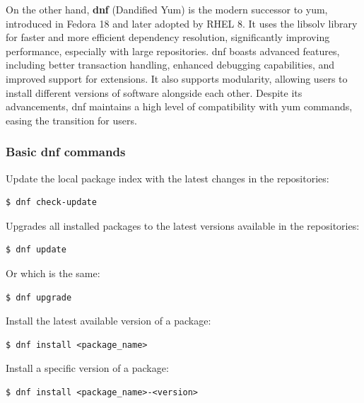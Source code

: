 \documentclass{article}
\newenvironment{codetemplate}[1][]{%
  \mybasecolorbox[#1]
  \itshape
}{%
  \endmybasecolorbox
}
\begin{document}
On the other hand, \textbf{dnf} (Dandified Yum) is the modern successor to yum, introduced in Fedora 18 and later adopted by RHEL 8. It uses the libsolv library for faster and more efficient dependency resolution, significantly improving performance, especially with large repositories. dnf boasts advanced features, including better transaction handling, enhanced debugging capabilities, and improved support for extensions. It also supports modularity, allowing users to install different versions of software alongside each other. Despite its advancements, dnf maintains a high level of compatibility with yum commands, easing the transition for users.

\subsubsection{Basic dnf commands}
Update the local package index with the latest changes in the repositories:
\begin{codetemplate}
\begin{verbatim}
$ dnf check-update
\end{verbatim}
\end{codetemplate}

Upgrades all installed packages to the latest versions available in the repositories:
\begin{codetemplate}
\begin{verbatim}
$ dnf update
\end{verbatim}
\end{codetemplate}

Or which is the same:
\begin{codetemplate}
\begin{verbatim}
$ dnf upgrade
\end{verbatim}
\end{codetemplate}

Install the latest available version of a package:
\begin{codetemplate}
\begin{verbatim}
$ dnf install <package_name>
\end{verbatim}
\end{codetemplate}
    
Install a specific version of a package:
\begin{codetemplate}
\begin{verbatim}
$ dnf install <package_name>-<version>
\end{verbatim}
\end{codetemplate}
\end{document}
